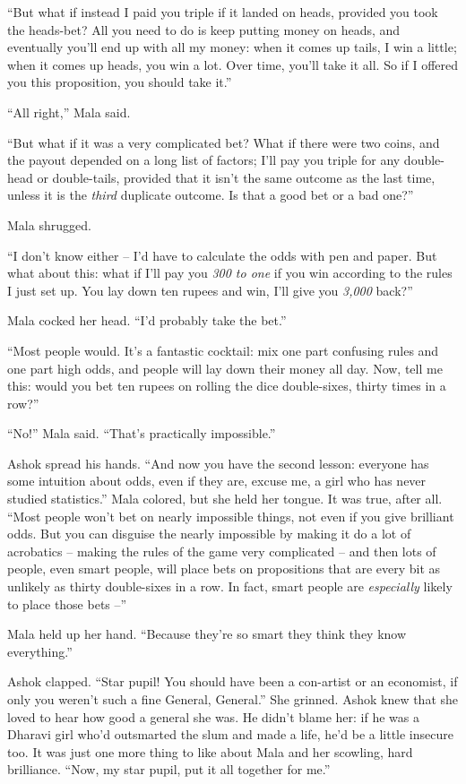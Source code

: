 ``But what if instead I paid you triple if it landed on heads,
provided you took the heads-bet? All you need to do is keep putting
money on heads, and eventually you'll end up with all my money:
when it comes up tails, I win a little; when it comes up heads, you
win a lot. Over time, you'll take it all. So if I offered you this
proposition, you should take it.''

``All right,'' Mala said.

``But what if it was a very complicated bet? What if there were two
coins, and the payout depended on a long list of factors; I'll pay
you triple for any double-head or double-tails, provided that it
isn't the same outcome as the last time, unless it is the
\emph{third} duplicate outcome. Is that a good bet or a bad one?''

Mala shrugged.

``I don't know either -- I'd have to calculate the odds with pen and
paper. But what about this: what if I'll pay you \emph{300 to one}
if you win according to the rules I just set up. You lay down ten
rupees and win, I'll give you \emph{3,000} back?''

Mala cocked her head. ``I'd probably take the bet.''

``Most people would. It's a fantastic cocktail: mix one part
confusing rules and one part high odds, and people will lay down
their money all day. Now, tell me this: would you bet ten rupees on
rolling the dice double-sixes, thirty times in a row?''

``No!'' Mala said. ``That's practically impossible.''

Ashok spread his hands. ``And now you have the second lesson:
everyone has some intuition about odds, even if they are, excuse
me, a girl who has never studied statistics.'' Mala colored, but she
held her tongue. It was true, after all. ``Most people won't bet on
nearly impossible things, not even if you give brilliant odds. But
you can disguise the nearly impossible by making it do a lot of
acrobatics -- making the rules of the game very complicated -- and
then lots of people, even smart people, will place bets on
propositions that are every bit as unlikely as thirty double-sixes
in a row. In fact, smart people are \emph{especially} likely to
place those bets --''

Mala held up her hand. ``Because they're so smart they think they
know everything.''

Ashok clapped. ``Star pupil! You should have been a con-artist or an
economist, if only you weren't such a fine General, General.'' She
grinned. Ashok knew that she loved to hear how good a general she
was. He didn't blame her: if he was a Dharavi girl who'd outsmarted
the slum and made a life, he'd be a little insecure too. It was
just one more thing to like about Mala and her scowling, hard
brilliance. ``Now, my star pupil, put it all together for me.''

